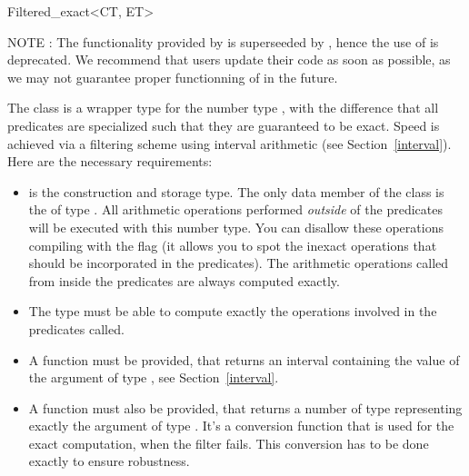 \begin{ccRefClass}{Filtered_exact<CT, ET>} %
\label{filter}


\ccDefinition

NOTE : The functionality provided by 
is superseeded by , hence the use of
 is deprecated.  We recommend that
users update their code as soon as possible, as we may not guarantee
proper functionning of  in the future.


The class  is a wrapper type for the number
type , with the difference
that all predicates are specialized such that they are guaranteed to be exact.
Speed is achieved via a filtering scheme using interval arithmetic (see
Section~\ref{interval}).  Here are the necessary requirements:

\begin{itemize}
\item {} is the construction and storage type.  The only data member of
      the class  is the  of type
      .  All arithmetic operations performed {\em outside} of the
      predicates will be executed with this number type.  You can disallow
      these operations compiling with the flag
       (it allows you
      to spot the inexact operations that should be incorporated in the
      predicates).
      The arithmetic operations called from inside the predicates are always
      computed exactly.
\item The  type must be able to compute exactly the operations involved
      in the predicates called.
\item A  function must
      be provided, that returns an interval containing the value of the
      argument of type , see Section~\ref{interval}.
\item A  function must also be provided, that
      returns a number of type  representing exactly the argument of
      type .  It's a conversion function that is used for the exact
      computation, when the filter fails.
      This conversion has to be done exactly to ensure robustness.
\end{itemize}


\end{ccRefClass}
